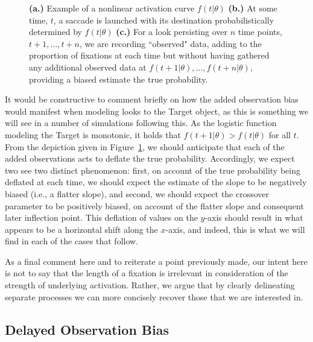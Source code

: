 \begin{figure}[H]
    \centering
    \caption{ \textbf{(a.)} Example of a nonlinear activation curve $f(t|\theta)$ \textbf{(b.)} At some time, $t$, a saccade is launched with its destination probabilistically determined by $f(t|\theta)$ \textbf{(c.)} For a look persisting over $n$ time points, $t+1, \dots, t+n$, we are recording ``observed" data, adding to the proportion of fixations at each time but without having gathered any additional observed data at $f(t+1 | \theta), \dots,f(t+n | \theta)$, providing a biased estimate the true probability. }
\label{fig:folly_of_fixation}
\end{figure}

It would be constructive to comment briefly on how the added observation bias would manifest when modeling looks to the Target object, as this is something we will see in a number of simulations following this. As the logistic function modeling the Target is monotonic, it holds that $f(t+1|\theta) > f(t | \theta)$ for all $t$. From the depiction given in Figure~\ref{fig:folly_of_fixation}, we should anticipate that each of the added observations acts to deflate the true probability. Accordingly, we expect two see two distinct phenomenon: first, on account of the true probability being deflated at each time, we should expect the estimate of the slope to be negatively biased (i.e., a flatter slope), and second, we should expect the crossover parameter to be positively biased, on account of the flatter slope and consequent later inflection point. This deflation of values on the $y$-axis should result in what appears to be a horizontal shift along the $x$-axis, and indeed, this is what we will find in each of the cases that follow.

As a final comment here and to reiterate a point previously made, our intent here is not to say that the length of a fixation is irrelevant in consideration of the strength of underlying activation. Rather, we argue that by clearly delineating separate processes we can more concisely recover those that we are interested in.  



\subsection{Delayed Observation Bias}


